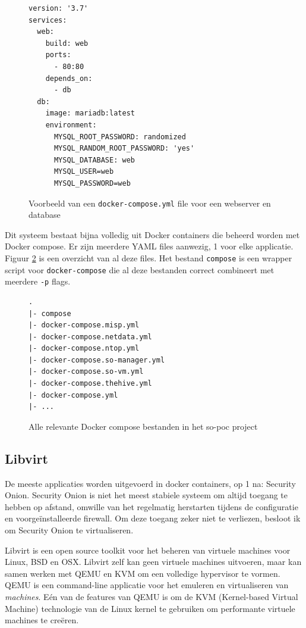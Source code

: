 \documentclass[a4paper,12pt]{report}
\begin{document}
\begin{figure}[H]
  \begin{lstlisting}
version: '3.7'
services:
  web:
    build: web
    ports:
      - 80:80
    depends_on:
      - db
  db:
    image: mariadb:latest
    environment:
      MYSQL_ROOT_PASSWORD: randomized
      MYSQL_RANDOM_ROOT_PASSWORD: 'yes'
      MYSQL_DATABASE: web
      MYSQL_USER=web
      MYSQL_PASSWORD=web
  \end{lstlisting}
  \caption{Voorbeeld van een \lstinline|docker-compose.yml| file voor een webserver en database}
  \label{fig:compose-web-example}
\end{figure}

Dit systeem bestaat bijna volledig uit Docker containers die beheerd worden met Docker compose.
Er zijn meerdere YAML files aanwezig, 1 voor elke applicatie.
Figuur \ref{fig:compose-so-poc-files} is een overzicht van al deze files.
Het bestand \lstinline|compose| is een wrapper script voor \lstinline{docker-compose} die al deze bestanden correct combineert met meerdere \lstinline|-p| flags.

\begin{figure}[H]
  \begin{lstlisting}
.
|- compose
|- docker-compose.misp.yml
|- docker-compose.netdata.yml
|- docker-compose.ntop.yml
|- docker-compose.so-manager.yml
|- docker-compose.so-vm.yml
|- docker-compose.thehive.yml
|- docker-compose.yml
|- ...
  \end{lstlisting}
  \caption{Alle relevante Docker compose bestanden in het so-poc project}
  \label{fig:compose-so-poc-files}
\end{figure}

\subsection{Libvirt}
De meeste applicaties worden uitgevoerd in docker containers, op 1 na: Security Onion.
Security Onion is niet het meest stabiele systeem om altijd toegang te hebben op afstand, omwille van het regelmatig herstarten tijdens de configuratie en voorgeïnstalleerde firewall.
Om deze toegang zeker niet te verliezen, besloot ik om Security Onion te virtualiseren.

Libvirt is een open source toolkit voor het beheren van virtuele machines voor Linux, BSD en OSX.
Libvirt zelf kan geen virtuele machines uitvoeren, maar kan samen werken met QEMU en KVM om een volledige hypervisor te vormen.
QEMU is een command-line applicatie voor het emuleren en virtualiseren van \emph{machines}.
Eén van de features van QEMU is om de KVM (Kernel-based Virtual Machine) technologie van de Linux kernel te gebruiken om performante virtuele machines te creëren.
\end{document}
